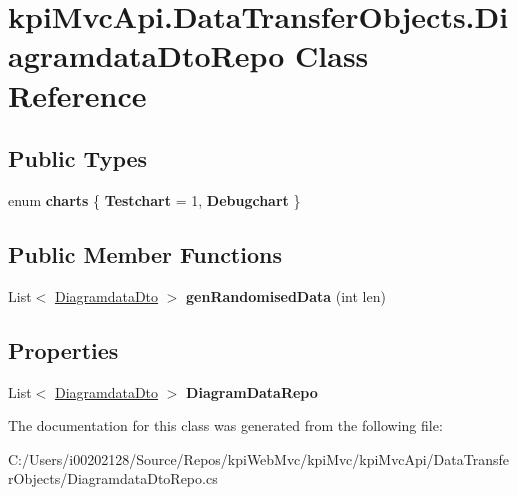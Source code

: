 \hypertarget{classkpi_mvc_api_1_1_data_transfer_objects_1_1_diagramdata_dto_repo}{}\section{kpi\+Mvc\+Api.\+Data\+Transfer\+Objects.\+Diagramdata\+Dto\+Repo Class Reference}
\label{classkpi_mvc_api_1_1_data_transfer_objects_1_1_diagramdata_dto_repo}
\subsection*{Public Types}
\begin{DoxyCompactItemize}
\item 
\mbox{\label{classkpi_mvc_api_1_1_data_transfer_objects_1_1_diagramdata_dto_repo_a58bbabee43b0cec73f86ae00072a5ba6}} 
enum {\bfseries charts} \{ {\bfseries Testchart} = 1, 
{\bfseries Debugchart}
 \}
\end{DoxyCompactItemize}
\subsection*{Public Member Functions}
\begin{DoxyCompactItemize}
\item 
\mbox{\label{classkpi_mvc_api_1_1_data_transfer_objects_1_1_diagramdata_dto_repo_a20acbfa7c0cc330f40ea80fae3a8ba87}} 
List$<$ \hyperlink{classkpi_mvc_api_1_1_data_transfer_objects_1_1_diagramdata_dto}{Diagramdata\+Dto} $>$ {\bfseries gen\+Randomised\+Data} (int len)
\end{DoxyCompactItemize}
\subsection*{Properties}
\begin{DoxyCompactItemize}
\item 
\mbox{\label{classkpi_mvc_api_1_1_data_transfer_objects_1_1_diagramdata_dto_repo_a832e84f15dc1ff02134038bf8325306d}} 
List$<$ \hyperlink{classkpi_mvc_api_1_1_data_transfer_objects_1_1_diagramdata_dto}{Diagramdata\+Dto} $>$ {\bfseries Diagram\+Data\+Repo}
\end{DoxyCompactItemize}


The documentation for this class was generated from the following file\+:\begin{DoxyCompactItemize}
\item 
C\+:/\+Users/i00202128/\+Source/\+Repos/kpi\+Web\+Mvc/kpi\+Mvc/kpi\+Mvc\+Api/\+Data\+Transfer\+Objects/Diagramdata\+Dto\+Repo.\+cs\end{DoxyCompactItemize}
